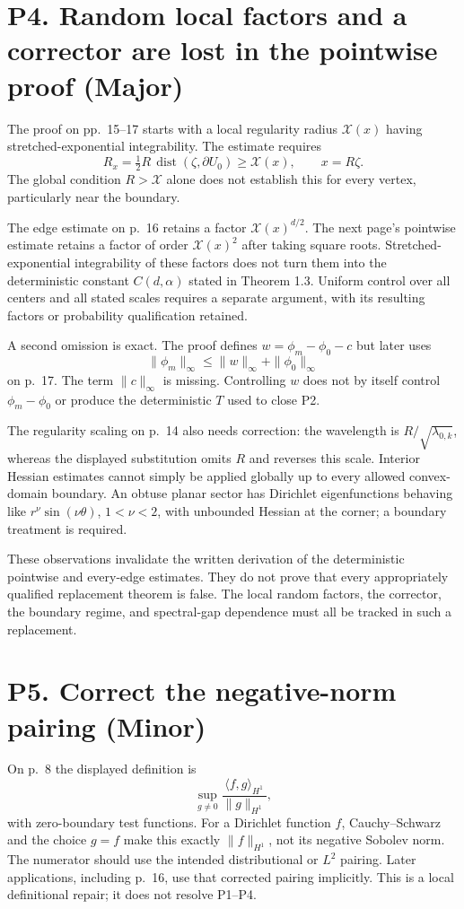 \documentclass[10pt]{article}
\begin{document}
\section*{P4. Random local factors and a corrector are lost in the pointwise proof (Major)}
The proof on pp. 15–17 starts with a local regularity radius \(\mathcal X(x)\) having stretched-exponential integrability. The estimate requires \[R_x=\tfrac12 R\,\operatorname{dist}(\zeta,\partial U_0)
 \geq\mathcal X(x),\qquad x=R\zeta.\] The global condition \(R>\mathcal X\) alone does not establish this for every vertex, particularly near the boundary.\par
The edge estimate on p. 16 retains a factor \(\mathcal X(x)^{d/2}\). The next page’s pointwise estimate retains a factor of order \(\mathcal X(x)^2\) after taking square roots. Stretched-exponential integrability of these factors does not turn them into the deterministic constant \(C(d,\alpha)\) stated in Theorem 1.3. Uniform control over all centers and all stated scales requires a separate argument, with its resulting factors or probability qualification retained.\par
A second omission is exact. The proof defines \(w=\phi_m-\phi_0-c\) but later uses \[\|\phi_m\|_\infty\leq\|w\|_\infty+\|\phi_0\|_\infty\] on p. 17. The term \(\|c\|_\infty\) is missing. Controlling \(w\) does not by itself control \(\phi_m-\phi_0\) or produce the deterministic \(T\) used to close P2.\par
The regularity scaling on p. 14 also needs correction: the wavelength is \(R/\sqrt{\lambda_{0,k}}\), whereas the displayed substitution omits \(R\) and reverses this scale. Interior Hessian estimates cannot simply be applied globally up to every allowed convex-domain boundary. An obtuse planar sector has Dirichlet eigenfunctions behaving like \(r^\nu\sin(\nu\theta)\), \(1<\nu<2\), with unbounded Hessian at the corner; a boundary treatment is required.\par
These observations invalidate the written derivation of the deterministic pointwise and every-edge estimates. They do not prove that every appropriately qualified replacement theorem is false. The local random factors, the corrector, the boundary regime, and spectral-gap dependence must all be tracked in such a replacement.\par
\section*{P5. Correct the negative-norm pairing (Minor)}
On p. 8 the displayed definition is \[\sup_{g\ne0}\frac{\langle f,g\rangle_{H^1}}{\|g\|_{H^1}},\] with zero-boundary test functions. For a Dirichlet function \(f\), Cauchy–Schwarz and the choice \(g=f\) make this exactly \(\|f\|_{H^1}\), not its negative Sobolev norm. The numerator should use the intended distributional or \(L^2\) pairing. Later applications, including p. 16, use that corrected pairing implicitly. This is a local definitional repair; it does not resolve P1–P4.\par
\end{document}

